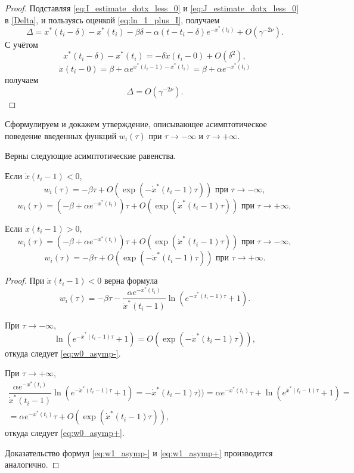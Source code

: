 \begin{proof}
	Подставляя \eqref{eq:I_estimate_dotx_less_0} и \eqref{eq:J_estimate_dotx_less_0} в \eqref{Delta}, и пользуясь оценкой \eqref{eq:ln_1_plus_I}, получаем
	\[
	\Delta = x^*(t_i - \delta) - x^*(t_i) - \beta \delta - \alpha (t - t_i - \delta) e^{-x^*(t_i)} + O(\gamma^{-2\nu}).
	\]
	С учётом 
	\[
	x^*(t_i - \delta) - x^*(t_i) = -\delta\dot{x}(t_i - 0) + O(\delta^2),
	\]
	\[
	\dot{x}(t_i - 0) = \beta + \alpha e^{x^*(t_i - 1) - x^*(t_i)} = \beta + \alpha e^{-x^*(t_i)}
	\]
	получаем
	\[
	\Delta = O(\gamma^{-2\nu}).
	\]
\end{proof}

Сформулируем и докажем утверждение, описывающее асимптотическое поведение введенных функций $w_i(\tau)$ при $\tau\to-\infty$ и $\tau\to+\infty$.
%
\begin{lemma}\label{lm:lem_w_asymp} Верны следующие асимптотические равенства.

Если $\dot{x}(t_i - 1) < 0$,
\begin{equation}
	\label{eq:w0_asymp-}
	w_i(\tau) = -\beta \tau + O(\exp(-\dot{x}^*(t_i - 1) \tau)) \text{ при } \tau \to -\infty,
\end{equation}
\begin{equation}
	\label{eq:w0_asymp+}
	w_i(\tau) = (-\beta + \alpha e^{-x^*(t_i)})\tau + O(\exp(\dot{x}^*(t_i - 1) \tau)) \text{ при } \tau \to +\infty,
\end{equation}
	
Если $\dot{x}(t_i - 1) > 0$,
\begin{equation}
	\label{eq:w1_asymp-}
	w_i(\tau) = (-\beta + \alpha e^{-x^*(t_i)})\tau + O(\exp(\dot{x}^*(t_i - 1) \tau)) \text{ при } \tau \to -\infty,
\end{equation}
\begin{equation}
	\label{eq:w1_asymp+}
	w_i(\tau) = -\beta \tau + O(\exp(-\dot{x}^*(t_i - 1) \tau)) \text{ при } \tau \to +\infty.
\end{equation}
\end{lemma}
\begin{proof}
	При $\dot{x}(t_i - 1) < 0$ верна формула
	\[
	w_i(\tau) = -\beta \tau - \dfrac{\alpha e^{-x^*(t_i)}}{\dot{x}^*(t_i - 1)} \ln\left(e^{-\dot{x}^*(t_i - 1)\tau} + 1\right).
	\]
	
	При $\tau \to -\infty$,
	\[
	\ln\left(e^{-\dot{x}^*(t_i - 1)\tau} + 1\right) = O(\exp(-\dot{x}^*(t_i - 1)\tau)),
	\]
	 откуда следует \eqref{eq:w0_asymp-}.
	 
	При $\tau \to +\infty$,
	\begin{multline*}
	\dfrac{\alpha e^{-x^*(t_i)}}{\dot{x}^*(t_i - 1)} \ln\left(e^{-\dot{x}^*(t_i - 1)\tau} + 1\right) = -\dot{x}^*(t_i - 1)\tau)) = \alpha e^{-x^*(t_i)} \tau + \ln\left(e^{\dot{x}^*(t_i - 1)\tau} + 1\right) =\\
	= \alpha e^{-x^*(t_i)} \tau + O(\exp(\dot{x}^*(t_i - 1) \tau)),
	\end{multline*}
	откуда следует \eqref{eq:w0_asymp+}.
	
	Доказательство формул \eqref{eq:w1_asymp-} и \eqref{eq:w1_asymp+} производится аналогично.
\end{proof}

